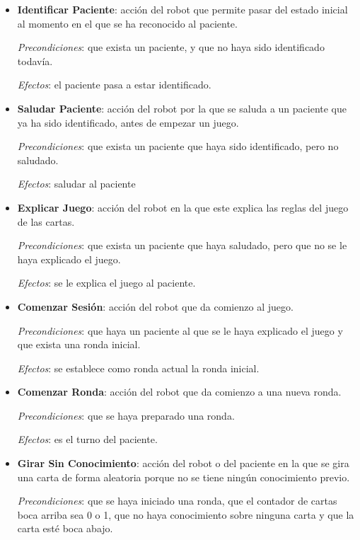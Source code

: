 \documentclass{uc3mpracticas}
\begin{document}
  \begin{itemize}
    \item \textbf{Identificar Paciente}: acción del robot que permite pasar del estado inicial al momento en el que se ha reconocido al paciente.

      \textit{Precondiciones}: que exista un paciente, y que no haya sido identificado todavía.

      \textit{Efectos}: el paciente pasa a estar identificado.

    \item \textbf{Saludar Paciente}: acción del robot por la que se saluda a un paciente que ya ha sido identificado, antes de empezar un juego.

      \textit{Precondiciones}: que exista un paciente que haya sido identificado, pero no saludado.

      \textit{Efectos}: saludar al paciente

    \item \textbf{Explicar Juego}: acción del robot en la que este explica las reglas del juego de las cartas.

      \textit{Precondiciones}: que exista un paciente que haya saludado, pero que no se le haya explicado el juego.

      \textit{Efectos}: se le explica el juego al paciente.

    \item \textbf{Comenzar Sesión}: acción del robot que da comienzo al juego.

      \textit{Precondiciones}: que haya un paciente al que se le haya explicado el juego y que exista una ronda inicial.

      \textit{Efectos}: se establece como ronda actual la ronda inicial.

    \item \textbf{Comenzar Ronda}: acción del robot que da comienzo a una nueva ronda.

      \textit{Precondiciones}: que se haya preparado una ronda.

      \textit{Efectos}: es el turno del paciente.

    \item \textbf{Girar Sin Conocimiento}: acción del robot o del paciente en la que se gira una carta de forma aleatoria porque no se tiene ningún conocimiento previo.

      \textit{Precondiciones}: que se haya iniciado una ronda, que el contador de cartas boca arriba sea 0 o 1, que no haya conocimiento sobre ninguna carta y que la carta esté boca abajo.


\end{itemize}
\end{document}
